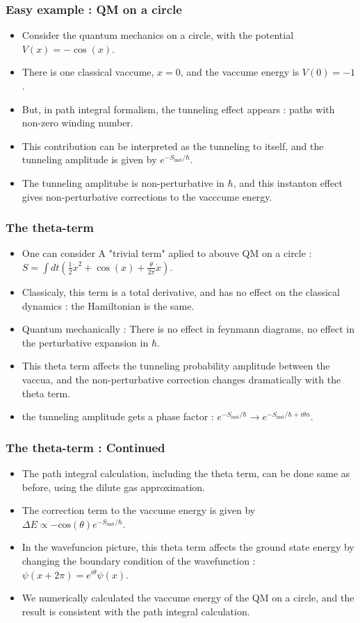 \documentclass[10pt]{beamer}
\begin{document}
\begin{frame}
    \frametitle{Easy example : QM on a circle}
    \begin{itemize}
    \item Consider the quantum mechanics on a circle, with the potential $V(x) = -\cos(x)$.
    \item There is one classical vaccume, $x = 0$, and the vaccume energy is $V(0) = -1$.
    \item But, in path integral formalism, the tunneling effect appears : paths with non-zero winding number.
    \item This contribution can be interpreted as the tunneling to itself, and the tunneling amplitude is given by $e^{-S_{\text{inst}}/\hbar}$.
    \item The tunneling amplitube is non-perturbative in $\hbar$, and this instanton effect gives non-perturbative corrections to the vacccume energy.
    \end{itemize}
    \end{frame}

\begin{frame}
    \frametitle{The theta-term}
    \begin{itemize}
    \item One can consider A "trivial term" aplied to abouve QM on a circle : $S= \int dt \left(\frac{1}{2}\dot{x}^2 + \cos(x) + \frac{\theta}{2\pi} \dot{x}\right)$.
    \item Classicaly, this term is a total derivative, and has no effect on the classical dynamics : the Hamiltonian is the same.
    \item Quantum mechanically : There is no effect in feynmann diagrams, no effect in the perturbative expansion in $\hbar$.
    \item This theta term affects the tunneling probability amplitude between the vaccua, and the non-perturbative correction changes dramatically with the theta term.
    \item the tunneling amplitude gets a phase factor : $e^{-S_{\text{inst}}/\hbar} \rightarrow e^{-S_{\text{inst}}/\hbar + i\theta n}$.
    \end{itemize}
    \end{frame}


\begin{frame}
    \frametitle{The theta-term : Continued}
    \begin{itemize}
    \item The path integral calculation, including the theta term, can be done same as before, using the dilute gas approximation.
    \item The correction term to the vaccume energy is given by $\Delta E \propto -\text{cos}(\theta)e^{-S_{\text{inst}}/\hbar}$.
    \item In the wavefuncion picture, this theta term affects the ground state energy by changing the boundary condition of the wavefunction : $\psi(x+2\pi) = e^{i\theta}\psi(x)$.
    \item We numerically calculated the vaccume energy of the QM on a circle, and the result is consistent with the path integral calculation.
    \end{itemize}
    \end{frame}
\end{document}

